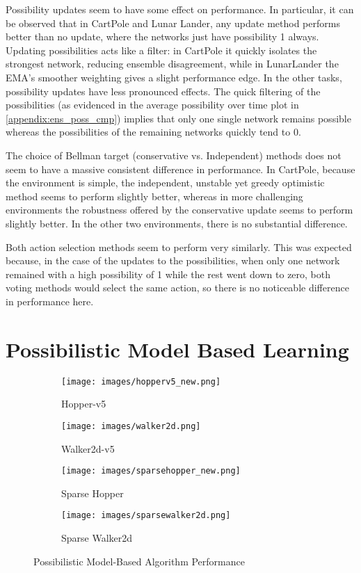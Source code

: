 \documentclass[11pt,a4paper]{report}
\begin{document}
\par Possibility updates seem to have some effect on performance. In particular, it can be observed that in CartPole and Lunar Lander, any update method performs better than no update, where the networks just have possibility 1 always. Updating possibilities acts like a filter: in CartPole it quickly isolates the strongest network, reducing ensemble disagreement, while in LunarLander the EMA’s smoother weighting gives a slight performance edge. In the other tasks, possibility updates have less pronounced effects. The quick filtering of the possibilities (as evidenced in the average possibility over time plot in \ref{appendix:ens_poss_cmp}) implies that only one single network remains possible whereas the possibilities of the remaining networks quickly tend to 0.  

\par The choice of Bellman target (conservative vs. Independent) methods does not seem to have a massive consistent difference in performance. In CartPole, because the environment is simple, the independent, unstable yet greedy optimistic method seems to perform slightly better, whereas in more challenging environments the robustness offered by the conservative update seems to perform slightly better. In the other two environments, there is no substantial difference.

\par Both action selection methods seem to perform very similarly. This was expected because, in the case of the updates to the possibilities, when only one network remained with a high possibility of 1 while the rest went down to zero, both voting methods would select the same action, so there is no noticeable difference in performance here.

\section{Possibilistic Model Based Learning}
\begin{figure}[ht]
  \centering
  \begin{subfigure}[b]{0.24\textwidth}
    \texttt{[image: images/hopperv5\_new.png]}
    \caption{Hopper-v5}
  \end{subfigure}
  \hfill
  \begin{subfigure}[b]{0.24\textwidth}
    \texttt{[image: images/walker2d.png]}
    \caption{Walker2d-v5}
  \end{subfigure}
  \hfill
  \begin{subfigure}[b]{0.24\textwidth}
    \texttt{[image: images/sparsehopper\_new.png]}
    \caption{Sparse Hopper}
  \end{subfigure}
  \hfill
  \begin{subfigure}[b]{0.24\textwidth}
    \texttt{[image: images/sparsewalker2d.png]}
    \caption{Sparse Walker2d}
  \end{subfigure}

  \caption{Possibilistic Model-Based Algorithm Performance} 
  \label{fig:modelbased}
\end{figure}
\end{document}
